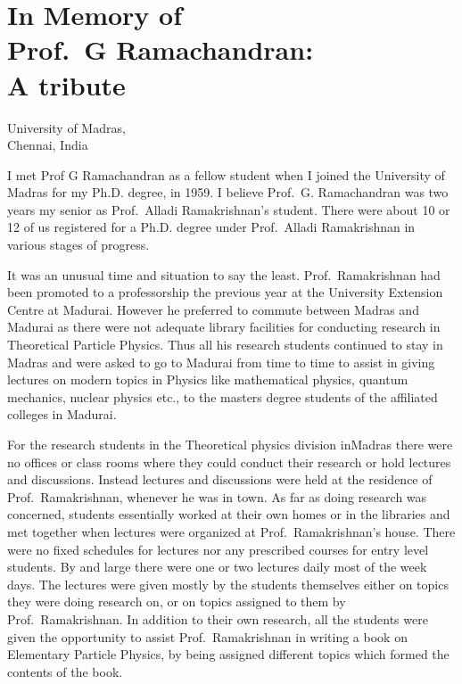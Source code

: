 \chapter[In Memory of Prof.\ G Ramachandran: A tribute]{In Memory of\\ Prof.\ G Ramachandran:\\ A tribute}\label{chap5}


\begin{center}
University of Madras,\\
Chennai, India
\end{center}

I met Prof G Ramachandran as a fellow student when I joined the University of Madras for my Ph.D. degree, in 1959. I believe Prof.\ G. Ramachandran was two years my senior as Prof.\ Alladi Ramakrishnan's student.  There were about 10 or 12 of us registered for a Ph.D. degree under Prof.\ Alladi Ramakrishnan in various stages of progress. 

It was an unusual time and situation  to say the least. Prof.\ Ramakrishnan had been promoted to a professorship the previous year at the University Extension Centre at Madurai. However he preferred to commute between Madras and Madurai as there were not adequate library facilities for conducting research in Theoretical Particle Physics. Thus all his research students continued to stay in Madras and were asked to go to Madurai from time to time to assist in giving lectures on modern topics in Physics like mathematical physics, quantum mechanics, nuclear physics etc., to the masters degree students of the affiliated colleges in Madurai.

For the research students in the Theoretical physics division in\break Madras there were no offices or class rooms where they could conduct their research or hold lectures and discussions. Instead lectures and discussions were held at the residence of Prof.\ Ramakrishnan, whenever he was in town. As far as doing research was concerned, students essentially worked at their own homes or in the libraries and met together when lectures were organized at Prof.\  Ramakrishnan's house. There were no fixed schedules for lectures nor any prescribed courses for entry level students. By and large there were one or two lectures daily  most of the week days. The lectures were  given mostly by the students themselves either on topics they were doing research on, or on topics assigned to them by Prof.\ Ramakrishnan. In addition to their own research, all the students were given the opportunity to assist Prof.\ Ramakrishnan in writing a book on Elementary Particle Physics, by being assigned different topics which formed the contents of the book.

